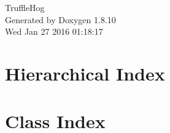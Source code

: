 \documentclass[twoside]{book}
\newcommand{\+}{\discretionary{\mbox{\scriptsize$\hookleftarrow$}}{}{}}
\newcommand{\clearemptydoublepage}{%
  \newpage{\pagestyle{empty}\cleardoublepage}%
}
\begin{document}
\hypersetup{pageanchor=false,
             bookmarks=true,
             bookmarksnumbered=true,
             pdfencoding=unicode
            }
\begin{titlepage}
\vspace*{7cm}
\begin{center}%
{\Large Truffle\+Hog }\\
\vspace*{1cm}
{\large Generated by Doxygen 1.8.10}\\
\vspace*{0.5cm}
{\small Wed Jan 27 2016 01:18:17}\\
\end{center}
\end{titlepage}
\clearemptydoublepage
\tableofcontents
\clearemptydoublepage
{}
\hypersetup{pageanchor=true}

\chapter{Hierarchical Index}

\chapter{Class Index}

\end{document}
